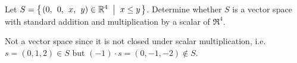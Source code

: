 
\begin{Exercise}[
name={},
title={}, 
difficulty=0,
origin={\cite{BS}}]
Let $S= \set{\rowvec{0, &0, &x, &y}\in\Re^4\suchthat x\leq y}$.  
Determine whether $S$ is a vector space with standard addition and 
multiplication by a scalar of $\Re^4$.
\end{Exercise}

\begin{Answer}
Not a vector space since it is not closed under scalar multiplication, i.e. $s=(0, 1, 2)\in S$ but $(-1)\cdot s=(0, -1, -2)\notin S$.

\end{Answer}
